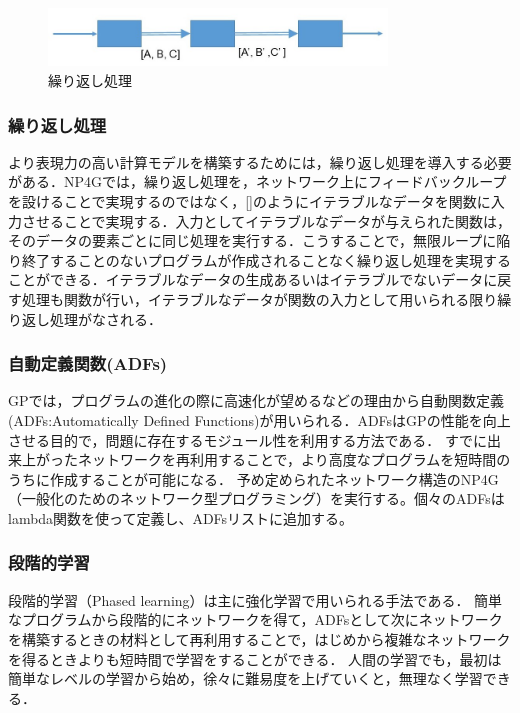 \documentclass[exploratorypaper]{jsaiart} %
\begin{document}
\begin{figure}[t]
    \begin{center}
        \includegraphics[width=90mm]{loop.jpg}
    \end{center}
    \capwidth=90mm %
    \caption{繰り返し処理}
    \label{fig:loop}
\end{figure}

\subsubsection{繰り返し処理}
より表現力の高い計算モデルを構築するためには，繰り返し処理を導入する必要がある．NP4Gでは，繰り返し処理を，ネットワーク上にフィードバックループを設けることで実現するのではなく，[]のようにイテラブルなデータを関数に入力させることで実現する．入力としてイテラブルなデータが与えられた関数は，そのデータの要素ごとに同じ処理を実行する．こうすることで，無限ループに陥り終了することのないプログラムが作成されることなく繰り返し処理を実現することができる．イテラブルなデータの生成あるいはイテラブルでないデータに戻す処理も関数が行い，イテラブルなデータが関数の入力として用いられる限り繰り返し処理がなされる．

\subsubsection{自動定義関数(ADFs)}
GPでは，プログラムの進化の際に高速化が望めるなどの理由から自動関数定義(ADFs:Automatically Defined Functions)\cite{adfs}が用いられる．ADFsはGPの性能を向上させる目的で，問題に存在するモジュール性を利用する方法である．
すでに出来上がったネットワークを再利用することで，より高度なプログラムを短時間のうちに作成することが可能になる．
予め定められたネットワーク構造のNP4G（一般化のためのネットワーク型プログラミング）を実行する。個々のADFsはlambda関数を使って定義し、ADFsリストに追加する。


\subsubsection{段階的学習}
段階的学習（Phased learning）は主に強化学習で用いられる手法である\cite{hodohara2012reinforcement}．
簡単なプログラムから段階的にネットワークを得て，ADFsとして次にネットワークを構築するときの材料として再利用することで，はじめから複雑なネットワークを得るときよりも短時間で学習をすることができる．
人間の学習でも，最初は簡単なレベルの学習から始め，徐々に難易度を上げていくと，無理なく学習できる．
\end{document}

